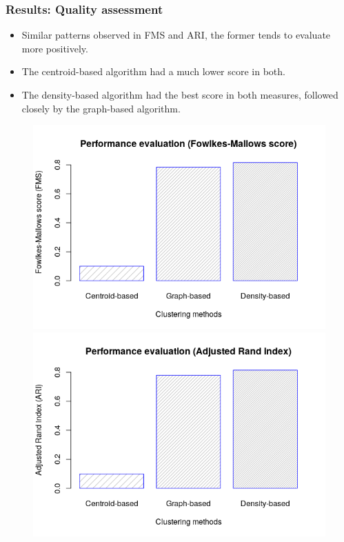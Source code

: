 \documentclass{beamer}
\begin{document}
\begin{frame}
\frametitle{Results: Quality assessment}
\begin{itemize}
\item Similar patterns observed in FMS and ARI, the former tends to evaluate more positively.
\item The centroid-based algorithm had a much lower score in both.
\item The density-based algorithm had the best score in both measures, followed closely by the graph-based algorithm.
\end{itemize}
\begin{figure}
\includegraphics[scale=0.369]{img/fms.png}
\includegraphics[scale=0.369]{img/ari.png}
\end{figure}
\end{frame}
\end{document}
